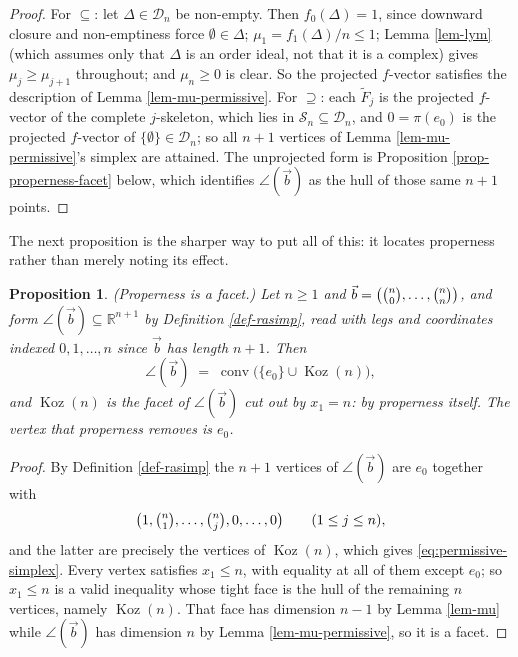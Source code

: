 \documentclass[11pt, a4paper, abstract=yes]{scrartcl}
\theoremstyle{definition}
\theoremstyle{remark}
\theoremstyle{plain}
\newtheorem{proposition}[definition]{Proposition}
\newcommand{\Koz}{\operatorname{Koz}}
\newcommand{\rasimp}{\angle}
\newcommand{\proj}{\pi}
\newcommand{\conv}{\operatorname{conv}}
\begin{document}
\begin{proof}
For \(\subseteq\): let \(\Delta\in\mathcal D_n\) be non-empty. Then \(f_0(\Delta)=1\), since downward
closure and non-emptiness force \(\emptyset\in\Delta\); \(\mu_1=f_1(\Delta)/n\le1\); Lemma
\ref{lem-lym} (which assumes only that \(\Delta\) is an order ideal, not that it is a complex)
gives \(\mu_j\ge\mu_{j+1}\) throughout; and \(\mu_n\ge0\) is clear. So the projected \(f\)-vector
satisfies the description of Lemma \ref{lem-mu-permissive}. For \(\supseteq\): each \(\tilde F_j\) is
the projected \(f\)-vector of the complete \(j\)-skeleton, which lies in \(\mathcal S_n\subseteq
\mathcal D_n\), and \(0=\proj(e_0)\) is the projected \(f\)-vector of
\(\lbrace\emptyset\rbrace\in\mathcal D_n\); so all \(n+1\) vertices of Lemma
\ref{lem-mu-permissive}'s simplex are attained. The unprojected form is Proposition
\ref{prop-properness-facet} below, which identifies \(\rasimp(\vec b)\) as the hull of those same
\(n+1\) points.
\end{proof}

The next proposition is the sharper way to put all of this: it locates properness rather than merely
noting its effect.

\begin{proposition}
(\emph{Properness is a facet.}) Let \(n\ge1\) and \(\vec b=\bigl(\tbinom n0,\dots,\tbinom nn\bigr)\), and
form \(\rasimp(\vec b)\subseteq\mathbb R^{n+1}\) by Definition \ref{def-rasimp}, read with legs and
coordinates indexed \(0,1,\dots,n\) since \(\vec b\) has length \(n+1\). Then
\begin{equation}\label{eq:permissive-simplex}
  \rasimp(\vec b)\;=\;\conv\bigl(\lbrace e_0\rbrace\cup\Koz(n)\bigr),
\end{equation}
and \(\Koz(n)\) is the facet of \(\rasimp(\vec b)\) cut out by \(x_1=n\): by properness
itself. The vertex that properness removes is \(e_0\).
\label{prop:properness-facet}
\label{prop-properness-facet}
\end{proposition}

\begin{proof}
By Definition \ref{def-rasimp} the \(n+1\) vertices of \(\rasimp(\vec b)\) are \(e_0\) together with
\begin{equation}\label{eq:permissive-verts}
  \bigl(1,\tbinom n1,\dots,\tbinom nj,0,\dots,0\bigr)\qquad(1\le j\le n),
\end{equation}
and the latter are precisely the vertices of \(\Koz(n)\), which gives
\eqref{eq:permissive-simplex}. Every vertex
satisfies \(x_1\le n\), with equality at all of them except \(e_0\); so \(x_1\le n\) is a valid
inequality whose tight face is the hull of the remaining \(n\) vertices, namely \(\Koz(n)\). That face
has dimension \(n-1\) by Lemma \ref{lem-mu} while \(\rasimp(\vec b)\) has dimension \(n\) by
Lemma \ref{lem-mu-permissive}, so it is a facet.
\end{proof}
\end{document}
